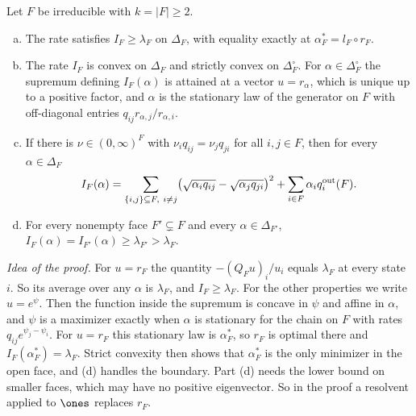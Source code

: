 \begin{proposition}\label{prop:rate}
Let $F$ be irreducible with $k=\lvert F\rvert\ge2$.
\begin{enumerate}[(a)]
\item The rate satisfies $I_F\ge\lambda_F$ on $\Delta_F$, with equality exactly at
$\alpha^*_F=l_F\circ r_F$.
\item The rate $I_F$ is convex on $\Delta_F$ and strictly convex on $\Delta_F^\circ$. For
$\alpha\in\Delta_F^\circ$ the supremum defining $I_F(\alpha)$ is attained at a
vector $u=r_\alpha$, which is unique up to a positive factor, and $\alpha$ is
the stationary law of the generator on $F$ with off-diagonal entries
$q_{ij}r_{\alpha,j}/r_{\alpha,i}$.
\item If there is $\nu\in(0,\infty)^F$ with $\nu_iq_{ij}=\nu_jq_{ji}$ for all
$i,j\in F$, then for every $\alpha\in\Delta_F$
\[
 I_F(\alpha)=\sum_{\{i,j\}\subseteq F,\ i\ne j}\bigl(\sqrt{\alpha_iq_{ij}}-\sqrt{\alpha_jq_{ji}}\bigr)^2
 +\sum_{i\in F}\alpha_iq_i^{\rm out}(F).
\]
\item For every nonempty face $F'\subsetneq F$ and every
$\alpha\in\Delta_{F'}$, $I_F(\alpha)=I_{F'}(\alpha)\ge\lambda_{F'}>\lambda_F$.
\end{enumerate}
\end{proposition}

\emph{Idea of the proof.} For $u=r_F$ the quantity $-(Q_Fu)_i/u_i$ equals
$\lambda_F$ at every state $i$. So its average over any $\alpha$ is
$\lambda_F$, and $I_F\ge\lambda_F$. For the other properties we write
$u=e^\psi$. Then the function inside the supremum is concave in $\psi$ and
affine in $\alpha$, and $\psi$ is a maximizer exactly when $\alpha$ is
stationary for the chain on $F$ with rates $q_{ij}e^{\psi_j-\psi_i}$. For
$u=r_F$ this stationary law is $\alpha^*_F$, so $r_F$ is optimal there and
$I_F(\alpha^*_F)=\lambda_F$. Strict convexity then shows that $\alpha^*_F$ is
the only minimizer in the open face, and (d) handles the boundary. Part (d)
needs the lower bound on smaller faces, which may have no positive
eigenvector. So in the proof a resolvent applied to $\ones$ replaces $r_F$.

